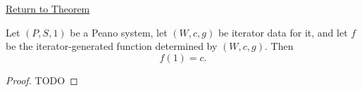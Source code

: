\newpage
{}
\label{prf:iterator-base-value}

\begin{remark*}[Return]
\hyperref[thm:iterator-base-value]{Return to Theorem}
\end{remark*}

\begin{theorem*}
Let $(P,S,1)$ be a Peano system, let $(W,c,g)$ be iterator data for it, and let
$f$ be the iterator-generated function determined by $(W,c,g)$. Then
\[
f(1)=c.
\]
\end{theorem*}

\begin{proof}
TODO
\end{proof}
